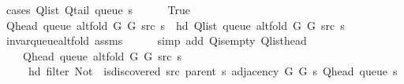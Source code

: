 \begin{isabellebody}
%
\isadelimproof
%
\endisadelimproof
%
\isatagproof
{}\isamarkupfalse%
\ {\isacharparenleft}{\kern0pt}cases\ {\isachardoublequoteopen}Q{\isacharunderscore}{\kern0pt}list\ {\isacharparenleft}{\kern0pt}Q{\isacharunderscore}{\kern0pt}tail\ {\isacharparenleft}{\kern0pt}queue\ s{\isacharparenright}{\kern0pt}{\isacharparenright}{\kern0pt}\ {\isacharequal}{\kern0pt}\ {\isacharbrackleft}{\kern0pt}{\isacharbrackright}{\kern0pt}{\isachardoublequoteclose}{\isacharparenright}{\kern0pt}\isanewline
\ \ \isamarkupfalse%
\ True\isanewline
\ \ \isamarkupfalse%
\ {\isachardoublequoteopen}Q{\isacharunderscore}{\kern0pt}head\ {\isacharparenleft}{\kern0pt}queue\ {\isacharparenleft}{\kern0pt}alt{\isacharunderscore}{\kern0pt}fold\ G{}\ G{}\ src\ s{\isacharparenright}{\kern0pt}{\isacharparenright}{\kern0pt}\ {\isacharequal}{\kern0pt}\ hd\ {\isacharparenleft}{\kern0pt}Q{\isacharunderscore}{\kern0pt}list\ {\isacharparenleft}{\kern0pt}queue\ {\isacharparenleft}{\kern0pt}alt{\isacharunderscore}{\kern0pt}fold\ G{}\ G{}\ src\ s{\isacharparenright}{\kern0pt}{\isacharparenright}{\kern0pt}{\isacharparenright}{\kern0pt}{\isachardoublequoteclose}\isanewline
\ \ \ \ \isamarkupfalse%
\ invar{\isacharunderscore}{\kern0pt}queue{\isacharunderscore}{\kern0pt}alt{\isacharunderscore}{\kern0pt}fold\ assms\isanewline
\ \ \ \ \isamarkupfalse%
\ {\isacharparenleft}{\kern0pt}simp\ add{\isacharcolon}{\kern0pt}\ Q{\isachardot}{\kern0pt}is{\isacharunderscore}{\kern0pt}empty\ Q{\isachardot}{\kern0pt}list{\isacharunderscore}{\kern0pt}head{\isacharparenright}{\kern0pt}\isanewline
\ \ \isamarkupfalse%
\isanewline
\ \ \ \ {\isachardoublequoteopen}Q{\isacharunderscore}{\kern0pt}head\ {\isacharparenleft}{\kern0pt}queue\ {\isacharparenleft}{\kern0pt}alt{\isacharunderscore}{\kern0pt}fold\ G{}\ G{}\ src\ s{\isacharparenright}{\kern0pt}{\isacharparenright}{\kern0pt}\ {\isacharequal}{\kern0pt}\isanewline
\ \ \ \ \ hd\ {\isacharparenleft}{\kern0pt}filter\ {\isacharparenleft}{\kern0pt}Not\ {\isasymcirc}\ is{\isacharunderscore}{\kern0pt}discovered\ src\ {\isacharparenleft}{\kern0pt}parent\ s{\isacharparenright}{\kern0pt}{\isacharparenright}{\kern0pt}\ {\isacharparenleft}{\kern0pt}adjacency\ G{}\ G{}\ s\ {\isacharparenleft}{\kern0pt}Q{\isacharunderscore}{\kern0pt}head\ {\isacharparenleft}{\kern0pt}queue\ s{\isacharparenright}{\kern0pt}{\isacharparenright}{\kern0pt}{\isacharparenright}{\kern0pt}{\isacharparenright}{\kern0pt}{\isachardoublequoteclose}\isanewline

\end{isabellebody}
